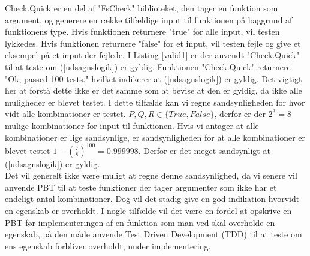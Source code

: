 Check.Quick er en del af "FsCheck" biblioteket, den tager en funktion som argument, og generere en række tilfældige input til funktionen på baggrund af funktionens type. Hvis funktionen returnere "true" for alle input, vil testen lykkedes. Hvis funktionen returnere "false" for et input, vil testen fejle og give et eksempel på et input der fejlede. I Listing \ref{valid1} er der anvendt "Check.Quick" til at teste om (\ref{udsagnslogik}) er gyldig. Funktionen "Check.Quick" returnere "Ok, passed 100 tests." hvilket indikerer at (\ref{udsagnslogik}) er gyldig. Det vigtigt her at forstå dette ikke er det samme som at bevise at den er gyldig, da ikke alle muligheder er blevet testet. I dette tilfælde kan vi regne sandsynligheden for hvor vidt alle kombinationer er testet. $P, Q, R \in \{True, False\}$, derfor er der $2^3 = 8$ mulige kombinationer for input til funktionen. Hvis vi antager at alle kombinationer er lige sandsynlige, er sandsynligheden for at alle kombinationer er blevet testet $1 - (\frac{7}{8})^{100} = 0.999998$. Derfor er det meget sandsynligt at (\ref{udsagnslogik}) er gyldig.\\
Det vil generelt ikke være muligt at regne denne sandsynlighed, da vi senere vil anvende PBT til at teste funktioner der tager argumenter som ikke har et endeligt antal kombinationer. Dog vil det stadig give en god indikation hvorvidt en egenskab er overholdt. I nogle tilfælde vil det være en fordel at opskrive en PBT før implementeringen af en funktion som man ved skal overholde en egenskab, på den måde anvende Test Driven Development (TDD)  til at teste om ens egenskab forbliver overholdt, under implementering.

